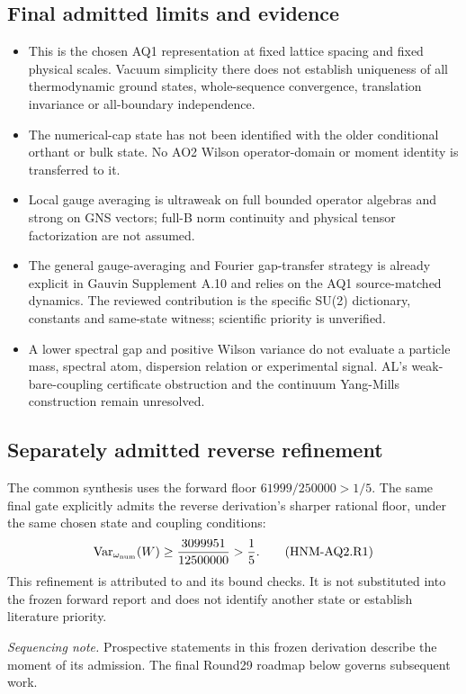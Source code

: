 \subsection*{Final admitted limits and evidence}
\begin{itemize}
\item This is the chosen AQ1 representation at fixed lattice spacing and fixed physical scales. Vacuum simplicity there does not establish uniqueness of all thermodynamic ground states, whole-sequence convergence, translation invariance or all-boundary independence.
\item The numerical-cap state has not been identified with the older conditional orthant or bulk state. No AO2 Wilson operator-domain or moment identity is transferred to it.
\item Local gauge averaging is ultraweak on full bounded operator algebras and strong on GNS vectors; full-B norm continuity and physical tensor factorization are not assumed.
\item The general gauge-averaging and Fourier gap-transfer strategy is already explicit in Gauvin Supplement A.10 and relies on the AQ1 source-matched dynamics. The reviewed contribution is the specific SU(2) dictionary, constants and same-state witness; scientific priority is unverified.
\item A lower spectral gap and positive Wilson variance do not evaluate a particle mass, spectral atom, dispersion relation or experimental signal. AL's weak-bare-coupling certificate obstruction and the continuum Yang-Mills construction remain unresolved.
\end{itemize}
\par{}\par{}

\subsection*{Separately admitted reverse refinement}
The common synthesis uses the forward floor $61999/250000>1/5$. The same final gate explicitly admits the reverse derivation's sharper rational floor, under the same chosen state and coupling conditions:
\begin{equation}
\operatorname{Var}_{\omega_{\rm num}}(W)\ge\frac{3099951}{12500000}>\frac15.
\tag{HNM-AQ2.R1}\label{r29:aq2:reverse-variance}
\end{equation}
This refinement is attributed to  and its bound checks. It is not substituted into the frozen forward report and does not identify another state or establish literature priority.

\emph{Sequencing note.} Prospective statements in this frozen derivation describe the moment of its admission. The final Round29 roadmap below governs subsequent work.

